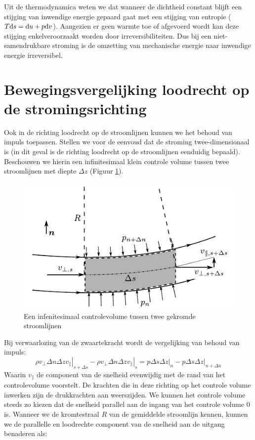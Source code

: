 Uit de thermodynamica weten we dat wanneer de dichtheid constant blijft een stijging van inwendige energie gepaard gaat met een stijging van entropie ($T\mathrm{d} s = \mathrm{d} u + p \mathrm{d} v$). Aangezien er geen warmte toe of afgevoerd wordt kan deze stijging enkelveroorzaakt worden door irreversibiliteiten. Dus bij een niet-samendrukbare stroming is de omzetting van mechanische energie naar inwendige energie irreversibel.

	\section{Bewegingsvergelijking loodrecht op de stromingsrichting}
Ook in de richting loodrecht op de stroomlijnen kunnen we het behoud van impuls toepassen. Stellen we voor de eenvoud dat de stroming twee-dimensionaal is (in dit geval is de richting loodrecht op de stroomlijnen eenduidig bepaald). Beschouwen we hierin een  infinitesimaal klein controle volume tussen twee stroomlijnen met diepte $\Delta z$ (Figuur \ref{fig:Controlevolume_tussen_stroomlijnen_loodrecht}).

\begin{figure}[htb]
	\centering
	\includegraphics{fig/deeltjesvergelijkingen/Controlevolume_tussen_stroomlijnen_loodrecht}
	\caption{Een infenitesimaal controlevolume tussen twee gekromde stroomlijnen}
	\label{fig:Controlevolume_tussen_stroomlijnen_loodrecht}
\end{figure}

Bij verwaarlozing van de zwaartekracht wordt de vergelijking van behoud van impuls:
\begin{equation}
	\left.\rho v_{\perp} \Delta n \Delta z v_{\parallel} \right|_{s+\Delta s}-
	\left.\rho v_{\perp} \Delta n \Delta z v_{\parallel} \right|_{s} = 
	\left. p \Delta s \Delta z \right|_{n} - \left. p \Delta s \Delta z \right|_{n+\Delta n} 
\end{equation}
Waarin $v_{\parallel}$ de component van de snelheid evenwijdig met de rand van het controlevolume voorstelt.
De krachten die in deze richting op het controle volume inwerken zijn de drukkrachten aan weerszijden.
We kunnen het controle volume steeds zo kiezen dat de snelheid parallel aan de ingang van het controle volume $0$ is. Wanneer we de kromtestraal $R$ van de gemiddelde stroomlijn kennen, kunnen we de parallelle en loodrechte component van de snelheid aan de uitgang benaderen als:

